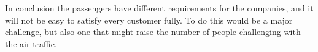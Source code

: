 In conclusion the passengers have different requirements for the companies, and it will not be easy to satisfy every customer fully. To do this would be a major challenge, but also one that might raise the number of people challenging with the air traffic.


